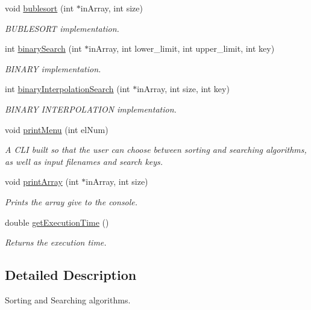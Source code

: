 \begin{DoxyCompactItemize}
void \hyperlink{class_sort___n___search_a3673aa59d2adfdec3e4b6ea2392b8398}{bublesort} (int $\ast$in\-Array, int size)
\begin{DoxyCompactList}\small\item\em B\-U\-B\-L\-E\-S\-O\-R\-T implementation. \end{DoxyCompactList}\item 
int \hyperlink{class_sort___n___search_ac5b19bdbc68b7a4eeb4b0fd5d3256190}{binary\-Search} (int $\ast$in\-Array, int lower\-\_\-limit, int upper\-\_\-limit, int key)
\begin{DoxyCompactList}\small\item\em B\-I\-N\-A\-R\-Y implementation. \end{DoxyCompactList}\item 
int \hyperlink{class_sort___n___search_a6597cc2fc0e04fa9ccc0855dc2e07d1c}{binary\-Interpolation\-Search} (int $\ast$in\-Array, int size, int key)
\begin{DoxyCompactList}\small\item\em B\-I\-N\-A\-R\-Y I\-N\-T\-E\-R\-P\-O\-L\-A\-T\-I\-O\-N implementation. \end{DoxyCompactList}\item 
void \hyperlink{class_sort___n___search_a63c1e873a63857191d90c088147ee083}{print\-Menu} (int el\-Num)
\begin{DoxyCompactList}\small\item\em A C\-L\-I built so that the user can choose between sorting and searching algorithms, as well as input filenames and search keys. \end{DoxyCompactList}\item 
void \hyperlink{class_sort___n___search_a7cf521f21bdcb5febabf4b0f6a032e1d}{print\-Array} (int $\ast$in\-Array, int size)
\begin{DoxyCompactList}\small\item\em Prints the array give to the console. \end{DoxyCompactList}\item 
double \hyperlink{class_sort___n___search_a842553953c3f0d3b6a787b7669e0a26e}{get\-Execution\-Time} ()
\begin{DoxyCompactList}\small\item\em Returns the execution time. \end{DoxyCompactList}\end{DoxyCompactItemize}


\subsection{Detailed Description}
Sorting and Searching algorithms. 

